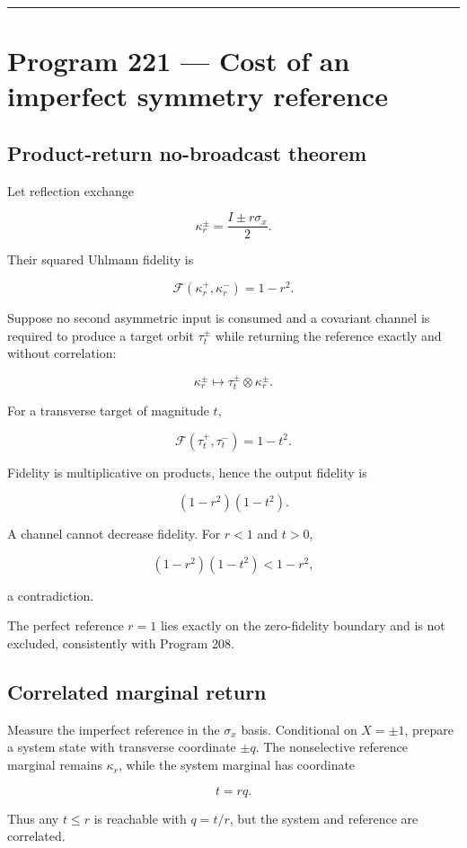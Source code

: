 \documentclass[11pt,a4paper,openany]{report}
\begin{document}
\par\medskip\hrule\medskip

\chapter{Program 221 --- Cost of an imperfect symmetry reference}

\section{Product-return no-broadcast theorem}

Let reflection exchange

\[
\kappa_r^\pm=\frac{I\pm r\sigma_x}{2}.
\]

Their squared Uhlmann fidelity is

\[
\mathcal F(\kappa_r^+,\kappa_r^-)=1-r^2.
\]

Suppose no second asymmetric input is consumed and a covariant channel is required to produce a target orbit \(\tau_t^\pm\) while returning the reference exactly and without correlation:

\[
\kappa_r^\pm
\longmapsto
\tau_t^\pm\otimes\kappa_r^\pm.
\]

For a transverse target of magnitude \(t\),

\[
\mathcal F(\tau_t^+,\tau_t^-)=1-t^2.
\]

Fidelity is multiplicative on products, hence the output fidelity is

\[
(1-r^2)(1-t^2).
\]

A channel cannot decrease fidelity. For \(r<1\) and \(t>0\),

\[
(1-r^2)(1-t^2)<1-r^2,
\]

a contradiction.

The perfect reference \(r=1\) lies exactly on the zero-fidelity boundary and is not excluded, consistently with Program 208.

\section{Correlated marginal return}

Measure the imperfect reference in the \(\sigma_x\) basis. Conditional on \(X=\pm1\), prepare a system state with transverse coordinate \(\pm q\). The nonselective reference marginal remains \(\kappa_r\), while the system marginal has coordinate

\[
t=rq.
\]

Thus any \(t\le r\) is reachable with \(q=t/r\), but the system and reference are correlated.
\end{document}
